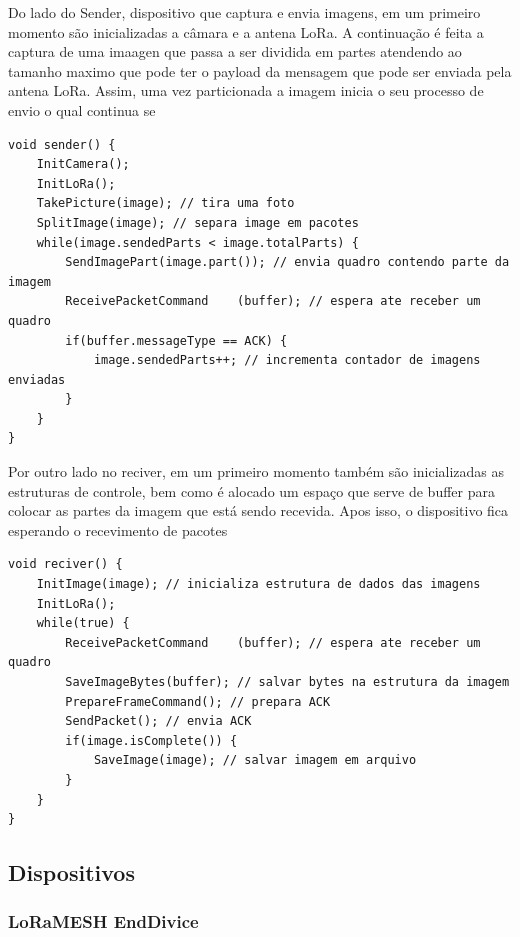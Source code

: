 \documentclass[
article,			%
12pt,				%
oneside,			%
a4paper,			%
english,			%
brazil,				%
sumario=tradicional
]{abntex2}
\begin{document}
Do lado do Sender, dispositivo que captura e envia imagens, em um primeiro momento são inicializadas a câmara e a antena LoRa. A continuação é feita a captura de uma imaagen que passa a ser dividida em partes atendendo ao tamanho maximo que pode ter o payload da mensagem que pode ser enviada pela antena LoRa. Assim, uma vez particionada a imagem inicia o seu processo de envio o qual continua se

\begin{lstlisting}[title=Algoritmo Stop and Wait - Sender]
void sender() {
	InitCamera();
	InitLoRa();
	TakePicture(image); // tira uma foto
	SplitImage(image); // separa image em pacotes
	while(image.sendedParts < image.totalParts) {
		SendImagePart(image.part()); // envia quadro contendo parte da imagem
		ReceivePacketCommand	(buffer); // espera ate receber um quadro
		if(buffer.messageType == ACK) {
			image.sendedParts++; // incrementa contador de imagens enviadas
		}
	}
}
\end{lstlisting}

Por outro lado no reciver, em um primeiro momento também são inicializadas as estruturas de controle, bem como é alocado um espaço que serve de buffer para colocar as partes da imagem que está sendo recevida. Apos isso, o dispositivo fica esperando o recevimento de pacotes

\begin{lstlisting}[title=Algoritmo Stop and Wait - Reciver]
void reciver() {
	InitImage(image); // inicializa estrutura de dados das imagens
	InitLoRa();
	while(true) {
		ReceivePacketCommand	(buffer); // espera ate receber um quadro
		SaveImageBytes(buffer); // salvar bytes na estrutura da imagem
		PrepareFrameCommand(); // prepara ACK
		SendPacket(); // envia ACK
		if(image.isComplete()) {
			SaveImage(image); // salvar imagem em arquivo
		}
	}
}
\end{lstlisting}

\cleardoublepage

\subsection{Dispositivos}\label{Dispositivos}

\subsubsection{LoRaMESH EndDivice}\label{LoRaMESH EndDivice}
\end{document}
